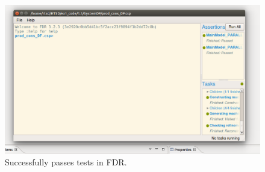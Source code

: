 \documentclass[a4paper,twoside,11pt]{article}
\begin{document}
\begin{figure}
 \centering
 \includegraphics[width=\textwidth]{./images/1_1-SystemDF.png}
 \caption{Successfully passes tests in FDR.}
 \label{fig:FDR_DF}
\end{figure}
\end{document}
